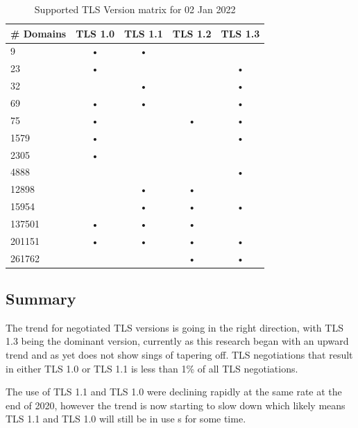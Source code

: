 \documentclass{mscreport}
\begin{document}
\begin{table}[t]
  \begin{center}
    \begin{tabular}{|l|c|c|c|c|}  %
      \hline
      \textbf{\# Domains} & \textbf{TLS 1.0} & \textbf{TLS 1.1} & \textbf{TLS 1.2} & \textbf{TLS 1.3} \\
      \hline
      9      & • & • &  & \\
	  \hline
      23     & • &  &  & •\\
	  \hline
      32     &   & • &   & •\\
	  \hline
      69     & • & • &   & •\\
	  \hline
      75     & • &   & • & •\\
	  \hline
      1579   & • &   &   & •\\
	  \hline
      2305   & • &   &   &  \\
	  \hline
      4888   &   &   &   & •\\
	  \hline
      12898  &   & • & • &  \\
	  \hline
      15954  &   & • & • & •\\
	  \hline
      137501 & • & • & • &  \\
	  \hline
      201151 & • & • & • & •\\
	  \hline
      261762 &   &   & • & •\\
	  \hline
    \end{tabular}
    \caption{Supported TLS Version matrix for 02 Jan 2022}
    \label{table:tls_supported_matrix} %
  \end{center}
\end{table}


\subsection{Summary}

\noindent
The trend for negotiated TLS versions is going in the right direction, with TLS 1.3 being the dominant version, currently as this research began with an upward trend and as yet does not show sings of tapering off. TLS negotiations that result in either TLS 1.0 or TLS 1.1 is less than 1\% of all TLS negotiations.

\vspace{0.3cm} \noindent
The use of TLS 1.1 and TLS 1.0 were declining rapidly at the same rate at the end of 2020, however the trend is now starting to slow down which likely means TLS 1.1 and TLS 1.0 will still be in use s for some time.
\end{document}
